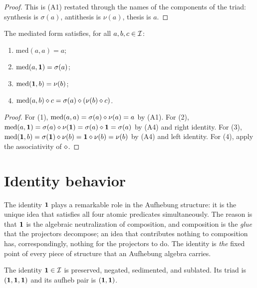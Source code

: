 \begin{proof}
This is (A1) restated through the names of the components of the
triad: synthesis is $\sigma(a)$, antithesis is $\nu(a)$, thesis is
$a$.
\end{proof}

\begin{lemma}\label{lem:mediation}
The mediated form satisfies, for all $a,b,c\in\mathcal{I}$:
\begin{enumerate}
\item $\mathrm{med}(a,a)=a$;
\item $\mathrm{med}(a,\mathbf{1})=\sigma(a)$;
\item $\mathrm{med}(\mathbf{1},b)=\nu(b)$;
\item $\mathrm{med}(a,b)\mathbin{\diamond} c=\sigma(a)\mathbin{\diamond}(\nu(b)\mathbin{\diamond} c)$.
\end{enumerate}
\end{lemma}

\begin{proof}
For (1), $\mathrm{med}(a,a)=\sigma(a)\mathbin{\diamond}\nu(a)=a$ by (A1). For (2),
$\mathrm{med}(a,\mathbf{1})=\sigma(a)\mathbin{\diamond}\nu(\mathbf{1})=\sigma(a)\mathbin{\diamond}\mathbf{1}
=\sigma(a)$ by (A4) and right identity. For (3),
$\mathrm{med}(\mathbf{1},b)=\sigma(\mathbf{1})\mathbin{\diamond}\nu(b)=\mathbf{1}\mathbin{\diamond}\nu(b)
=\nu(b)$ by (A4) and left identity. For (4), apply the associativity
of $\mathbin{\diamond}$.
\end{proof}

\section{Identity behavior}\label{sec:aufheb-identity}

The identity $\mathbf{1}$ plays a remarkable role in the Aufhebung
structure: it is the unique idea that satisfies all four atomic
predicates simultaneously. The reason is that $\mathbf{1}$ is the
algebraic neutralization of composition, and composition is the
\emph{glue} that the projectors decompose; an idea that contributes
nothing to composition has, correspondingly, nothing for the
projectors to do. The identity is \emph{the} fixed point of every
piece of structure that an Aufhebung algebra carries.

\begin{theorem}\label{thm:ident-quad}
The identity $\mathbf{1}\in\mathcal{I}$ is preserved, negated, sedimented, and
sublated. Its triad is $(\mathbf{1},\mathbf{1},\mathbf{1})$ and its aufheb pair is
$(\mathbf{1},\mathbf{1})$.
\end{theorem}

